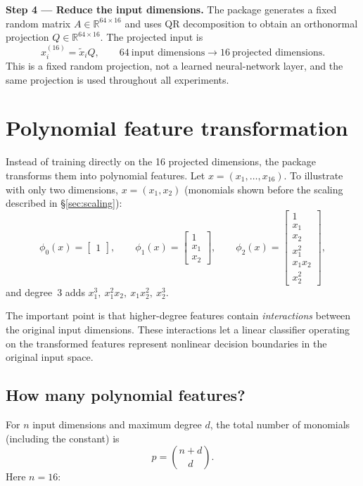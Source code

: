 \documentclass[11pt,a4paper]{article}
\newcommand{\R}{\mathbb{R}}
\begin{document}
\textbf{Step 4 --- Reduce the input dimensions.} The package generates a fixed random matrix $A\in\R^{64\times16}$ and uses QR decomposition to obtain an orthonormal projection $Q\in\R^{64\times16}$. The projected input is
\[
x_i^{(16)}=\tilde x_i Q,
\qquad
64\ \text{input dimensions}\longrightarrow 16\ \text{projected dimensions}.
\]
This is a fixed random projection, not a learned neural-network layer, and the same projection is used throughout all experiments.

\section{Polynomial feature transformation}

Instead of training directly on the 16 projected dimensions, the package transforms them into polynomial features. Let $x=(x_1,\ldots,x_{16})$. To illustrate with only two dimensions, $x=(x_1,x_2)$ (monomials shown before the scaling described in \S\ref{sec:scaling}):
\[
\phi_0(x)=\begin{bmatrix}1\end{bmatrix},\qquad
\phi_1(x)=\begin{bmatrix}1\\x_1\\x_2\end{bmatrix},\qquad
\phi_2(x)=\begin{bmatrix}1\\x_1\\x_2\\x_1^2\\x_1x_2\\x_2^2\end{bmatrix},
\]
and degree~3 adds $x_1^3,\ x_1^2x_2,\ x_1x_2^2,\ x_2^3$.

The important point is that higher-degree features contain \emph{interactions} between the original input dimensions. These interactions let a linear classifier operating on the transformed features represent nonlinear decision boundaries in the original input space.

\subsection{How many polynomial features?}

For $n$ input dimensions and maximum degree $d$, the total number of monomials (including the constant) is
\[
p=\binom{n+d}{d}.
\]
Here $n=16$:
\end{document}

